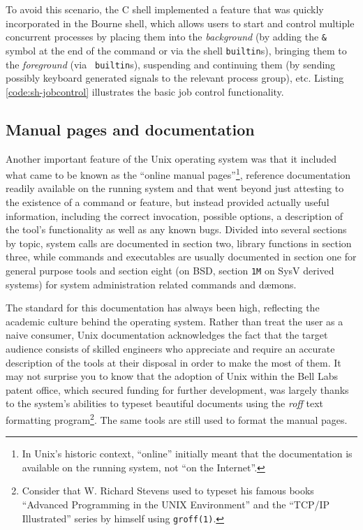 To avoid this scenario, the C shell implemented a
feature that was quickly incorporated in the Bourne
shell, which allows users to start and control
multiple concurrent processes by placing them into the
{\em background} (by adding the {\tt \&} symbol at the
end of the command or via the shell {\tt builtin}s),
bringing them to the {\em foreground} (via {\tt
builtin}s), suspending and continuing them (by sending
possibly keyboard generated signals to the relevant
process group), etc.  Listing \ref{code:sh-jobcontrol}
illustrates the basic job control functionality.

\subsection{Manual pages and documentation}
\label{unix:basics:manual}

Another important feature of the Unix operating system
was that it included what came to be known as the
``online manual pages''\footnote{In Unix's historic context,
``online'' initially meant that the documentation is
available on the running system, not ``on the
Internet''.}, reference documentation readily
available on the running system and that went beyond
just attesting to the existence of a command or
feature, but instead provided actually useful
information, including the correct invocation,
possible options, a description of the tool's
functionality as well as any known bugs.  Divided into
several sections by topic,  system calls are
documented in section two, library functions in
section three, while commands and executables are
usually documented in section one for general purpose
tools and section eight (on BSD, section {\tt 1M} on
SysV derived systems) for system administration
related commands and d\ae mons.

The standard for this documentation has always been
high, reflecting the academic culture behind the
operating system.  Rather than treat the user as a
naive consumer, Unix documentation acknowledges the
fact that the target audience consists of skilled
engineers who appreciate and require an accurate
description of the tools at their disposal in order to
make the most of them.  It may not surprise you to
know that the adoption of Unix within the Bell
Labs patent office, which
secured funding for further development, was largely
thanks to the system's abilities to typeset beautiful
documents using the {\em roff} text formatting
program\footnote{Consider that W. Richard
Stevens used to
typeset his famous books ``Advanced Programming in the
UNIX Environment'' and the ``TCP/IP Illustrated''
series by himself using {\tt groff(1)}.}.  The same
tools are still used to format the manual pages.


